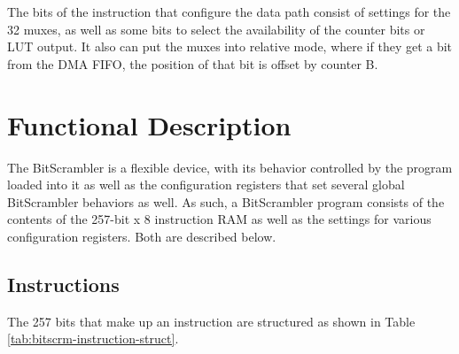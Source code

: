 \documentclass[main\_\_EN.tex]{subfiles}
\begin{document}
The bits of the instruction that configure the data path consist of settings for the 32 muxes, as well as some bits to select the availability of the counter bits or LUT output. It also can put the muxes into relative mode, where if they get a bit from the DMA FIFO, the position of that bit is offset by counter B.



\section{Functional Description}
\label{sec:bitscrm-func-descr}

The BitScrambler is a flexible device, with its behavior controlled by the program loaded into it as well as the configuration registers that set several global BitScrambler behaviors as well. As such, a BitScrambler program consists of the contents of the 257-bit x 8 instruction RAM as well as the settings for various configuration registers. Both are described below.

\subsection{Instructions}


The 257 bits that make up an instruction are structured as shown in Table \ref{tab:bitscrm-instruction-struct}.
\end{document}
